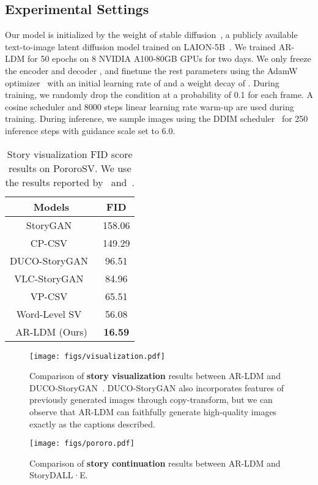 \documentclass[10pt,twocolumn,letterpaper]{article}
\begin{document}
\subsection{Experimental Settings}
Our model is initialized by the weight of stable diffusion~\cite{ldm}, a publicly available text-to-image latent diffusion model trained on LAION-5B~\cite{laion}. We trained AR-LDM for 50 epochs on 8 NVIDIA A100-80GB GPUs for two days. We only freeze the encoder  and decoder , and finetune the rest parameters using the AdamW optimizer~\cite{adamw} with an initial learning rate of  and a weight decay of . During training, we randomly drop the condition  at a probability of 0.1 for each frame. A cosine scheduler and 8000 steps linear learning rate warm-up are used during training. During inference, we sample images using the DDIM scheduler~\cite{ddim} for 250 inference steps with guidance scale  set to 6.0.

\begin{table}[!t]
\small
\centering
\setlength\tabcolsep{30pt}
\begin{tabularx}{\linewidth}{cc}
    \toprule
    Models & FID \\
    \midrule
    StoryGAN~\cite{storygan} & 158.06  \\
    CP-CSV~\cite{cpcsv} & 149.29 \\
    DUCO-StoryGAN~\cite{ducostorygan} & 96.51  \\
    VLC-StoryGAN~\cite{vlcstorygan} & 84.96  \\
    VP-CSV~\cite{vpcsv} & 65.51 \\
    Word-Level SV~\cite{wordlevelsv} & 56.08 \\
    AR-LDM (Ours) & \textbf{16.59} \\
    \bottomrule
    \end{tabularx}
\caption{Story visualization FID score results on PororoSV. We use the results reported by~\cite{vpcsv} and~\cite{wordlevelsv}.}
\label{tb:visualizationfid}
\end{table}

\begin{figure*}[!th]
\centering
\begin{subfigure}{\linewidth}
    \centering
    \texttt{[image: figs/visualization.pdf]}
    \caption{Comparison of \textbf{story visualization} results between AR-LDM and DUCO-StoryGAN~\cite{ducostorygan}. DUCO-StoryGAN also incorporates features of previously generated images through copy-transform, but we can observe that AR-LDM can faithfully generate high-quality images exactly as the captions described.}
    \label{fig:visualization}
\end{subfigure}
\begin{subfigure}{\linewidth}
    \centering
    \texttt{[image: figs/pororo.pdf]}
    \caption{Comparison of \textbf{story continuation} results between AR-LDM and StoryDALL·E.~\cite{storydalle}}
    \label{fig:pororocontinuation}
\end{subfigure}
\caption{Visual story synthesis results on PororoSV. Note the case in \cref{fig:visualization} and \cref{fig:pororocontinuation} is the same one.}
\label{fig:pororovisandcontinue}
\end{figure*}
\end{document}
